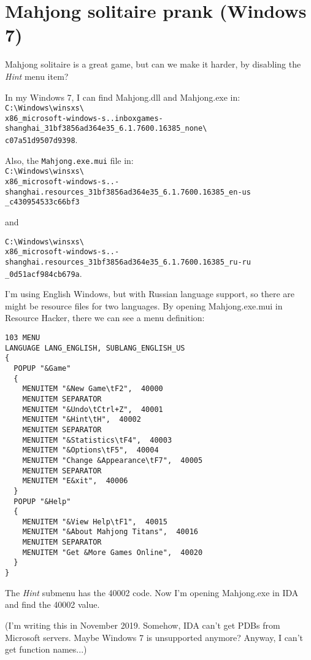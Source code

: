 ﻿\section{Mahjong solitaire prank (Windows 7)}

Mahjong solitaire is a great game, but can we make it harder, by disabling the \emph{Hint} menu item?

In my Windows 7, I can find Mahjong.dll and Mahjong.exe in:\\
\verb|C:\Windows\winsxs\| \\
\verb|x86_microsoft-windows-s..inboxgames-shanghai_31bf3856ad364e35_6.1.7600.16385_none\| \\
\verb|c07a51d9507d9398|.

Also, the \verb|Mahjong.exe.mui| file in:\\
\verb|C:\Windows\winsxs\| \\
\verb|x86_microsoft-windows-s..-shanghai.resources_31bf3856ad364e35_6.1.7600.16385_en-us| \\
\verb|_c430954533c66bf3|

and

\verb|C:\Windows\winsxs\| \\
\verb|x86_microsoft-windows-s..-shanghai.resources_31bf3856ad364e35_6.1.7600.16385_ru-ru| \\
\verb|_0d51acf984cb679a|.

I'm using English Windows, but with Russian language support, so there are might be resource files for two languages.
By opening Mahjong.exe.mui in Resource Hacker, there we can see a menu definition:

\begin{lstlisting}[caption=Menu resources from Mahjong.exe.mui]
103 MENU
LANGUAGE LANG_ENGLISH, SUBLANG_ENGLISH_US
{
  POPUP "&Game"
  {
    MENUITEM "&New Game\tF2",  40000
    MENUITEM SEPARATOR
    MENUITEM "&Undo\tCtrl+Z",  40001
    MENUITEM "&Hint\tH",  40002
    MENUITEM SEPARATOR
    MENUITEM "&Statistics\tF4",  40003
    MENUITEM "&Options\tF5",  40004
    MENUITEM "Change &Appearance\tF7",  40005
    MENUITEM SEPARATOR
    MENUITEM "E&xit",  40006
  }
  POPUP "&Help"
  {
    MENUITEM "&View Help\tF1",  40015
    MENUITEM "&About Mahjong Titans",  40016
    MENUITEM SEPARATOR
    MENUITEM "Get &More Games Online",  40020
  }
}
\end{lstlisting}

The \emph{Hint} submenu has the 40002 code.
Now I'm opening Mahjong.exe in IDA and find the 40002 value.

(I'm writing this in November 2019. Somehow, IDA can't get PDBs from Microsoft servers. Maybe Windows 7 is unsupported anymore?
Anyway, I can't get function names...)

